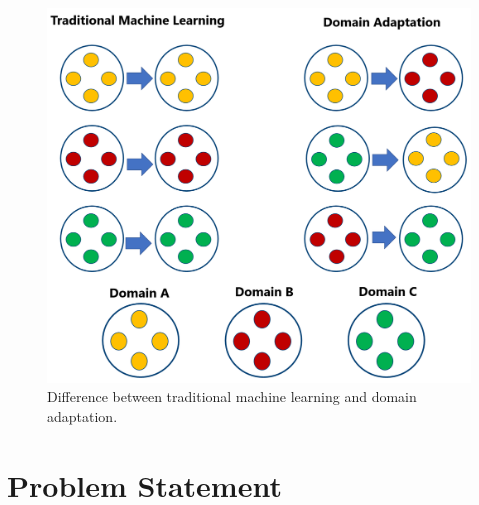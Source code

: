 \begin{figure}[H]
        \begin{center}
 	    \includegraphics[scale=0.30]{images/DomainAdaptation.png}
	    \caption[Difference between traditional machine learning and domain adaptation.]{Difference between traditional machine learning and domain adaptation.}
	    \label{fig:DomainAdaptation}
	    \end{center}
\end{figure}



\section{Problem Statement}\label{ProblemStatement}

